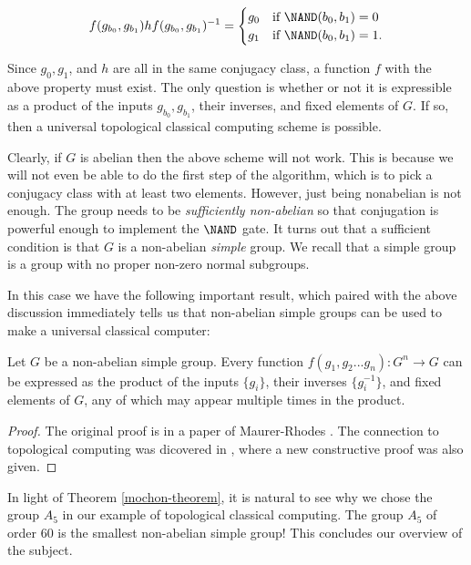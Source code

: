 $$
f(g_{b_0},g_{b_1})hf(g_{b_0},g_{b_1})^{-1}=
\begin{cases}
g_0 & \text{if   }\NAND(b_0,b_1)=0\\
g_1 & \text{if }\NAND(b_0,b_1)=1.
\end{cases}
$$

Since $g_0,g_1$, and $h$ are all in the same conjugacy class, a function $f$ with the above property must exist. The only question is whether or not it is expressible as a product of the inputs $g_{b_0}, g_{b_1}$, their inverses, and fixed elements of $G$. If so, then a universal topological classical computing scheme is possible.


Clearly, if $G$ is abelian then the above scheme will not work. This is because we will not even be able to do the first step of the algorithm, which is to pick a conjugacy class with at least two elements. However, just being nonabelian is not enough. The group needs to be {\em sufficiently non-abelian} so that conjugation is powerful enough to implement the $\NAND$ gate. It turns out that a sufficient condition is that $G$ is a non-abelian {\em simple} group. We recall that a simple group is a group with no proper non-zero normal subgroups.

In this case we have the following important result, which paired with the above discussion immediately tells us that non-abelian simple groups can be used to make a universal classical computer:

\begin{thrm}\label{mochon-theorem} Let $G$ be a non-abelian simple group. Every function $f(g_1,g_2...g_n):G^n\to G$ can be expressed as the product of the inputs $\{g_i\}$, their inverses $\{g_i^{-1}\}$, and fixed elements of $G$, any of which may appear multiple times in the product.
\end{thrm}
\begin{proof} The original proof is in a paper of Maurer-Rhodes \cite{maurer1965property}. The connection to topological computing was dicovered in \cite{mochon2003anyons}, where a new constructive proof was also given.
\end{proof}

\begin{rem}
In light of Theorem \ref{mochon-theorem}, it is natural to see why we chose the group $A_5$ in our example of topological classical computing. The group $A_5$ of order $60$ is the smallest non-abelian simple group! This concludes our overview of the subject.
\end{rem}

